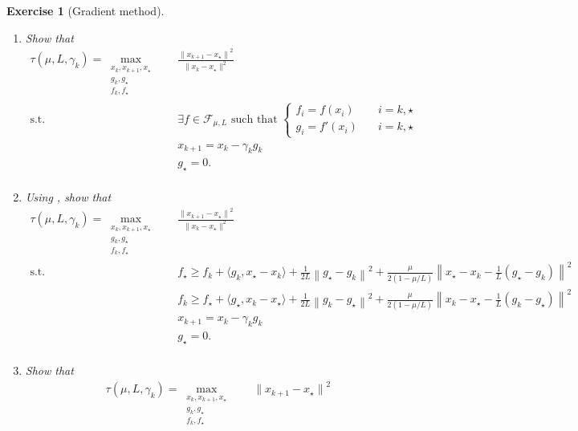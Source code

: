 \documentclass[11pt,a4paper]{article}
\newcommand{\normsq}[1]{{\left\lVert#1\right\rVert}^2}
\newcommand{\inner}[2]{{\langle #1, #2\rangle}}
\newtheorem{exercise}{Exercise}
\begin{document}
\begin{exercise}[Gradient method]
\begin{enumerate}
		Note that we will (sometimes abusively) use $\max$ instead of $\sup$ in the sequel as the optimum is usually attained for such problems (for this exercise, this is actually easy to show as the optimization problem is over a compact set).
	\item Show that
	\begin{equation*}
		\begin{aligned}
		\tau(\mu,L,\gamma_k)=\max_{\substack{x_k,x_{k+1},x_\star\\g_k,g_\star\\f_k,f_\star}} \quad & \frac{{\|x_{k+1}-x_\star\|}^2}{\|x_k-x_\star\|^2}\\
		\text{s.t. } & \exists f\in\mathcal{F}_{\mu,L} \text{ such that }\left\{\begin{array}{ll}
			f_i=f(x_i)\quad & i=k,\star\\
			g_i=f'(x_i)\quad & i=k,\star
			\end{array}\right.\\
		& x_{k+1}=x_k-\gamma_k  g_k\\
		& g_\star=0.\\
		\end{aligned}
		\end{equation*}
	\item Using , show that
	\begin{equation*}
		\begin{aligned}
		\tau(\mu,L,\gamma_k)=\max_{\substack{x_k,x_{k+1},x_\star\\g_k,g_\star\\f_k,f_\star}} \quad & \frac{{\|x_{k+1}-x_\star\|}^2}{\|x_k-x_\star\|^2}\\
		\text{s.t. } & f_\star\geqslant f_k+\inner{g_k}{x_\star-x_k}+\tfrac{1}{2L}\normsq{g_\star-g_k}+\tfrac{\mu}{2(1-\mu/L)}\normsq{x_\star-x_k-\tfrac{1}{L}(g_\star-g_k)}\\
			&f_k\geqslant f_\star+\inner{g_\star}{x_k-x_\star}+\tfrac{1}{2L}\normsq{g_k-g_\star}+\tfrac{\mu}{2(1-\mu/L)}\normsq{x_k-x_\star-\tfrac{1}{L}(g_k-g_\star)}\\
		& x_{k+1}=x_k-\gamma_k  g_k\\
		& g_\star=0.\\
		\end{aligned}
		\end{equation*}
	\item Show that
	\begin{equation*}
		\begin{aligned}
		\tau(\mu,L,\gamma_k)=\max_{\substack{x_k,x_{k+1},x_\star\\g_k,g_\star\\f_k,f_\star}} \quad &{\|x_{k+1}-x_\star\|}^2\\

\end{aligned}
\end{equation*}
\end{enumerate}
\end{exercise}
\end{document}
